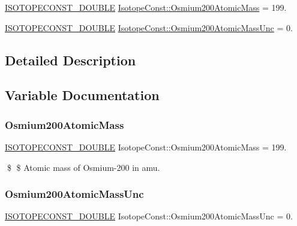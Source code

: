 \begin{DoxyCompactItemize}
\item 
\mbox{\hyperlink{group___isotope_const-_macros_ga8f45a7272ce02c0b4c65c44636ed719a}{I\+S\+O\+T\+O\+P\+E\+C\+O\+N\+S\+T\+\_\+\+D\+O\+U\+B\+LE}} \mbox{\hyperlink{group___isotope_const-_osmium-_os200_ga58991745178f9bca208ead1091e4ff09}{Isotope\+Const\+::\+Osmium200\+Atomic\+Mass}} = 199.
\item 
\mbox{\hyperlink{group___isotope_const-_macros_ga8f45a7272ce02c0b4c65c44636ed719a}{I\+S\+O\+T\+O\+P\+E\+C\+O\+N\+S\+T\+\_\+\+D\+O\+U\+B\+LE}} \mbox{\hyperlink{group___isotope_const-_osmium-_os200_ga963af7ae66cb65d49f5d8d737a31cd21}{Isotope\+Const\+::\+Osmium200\+Atomic\+Mass\+Unc}} = 0.
\end{DoxyCompactItemize}


\subsection{Detailed Description}


\subsection{Variable Documentation}
\mbox{\label{group___isotope_const-_osmium-_os200_ga58991745178f9bca208ead1091e4ff09}} 
\subsubsection{\texorpdfstring{Osmium200\+Atomic\+Mass}{Osmium200AtomicMass}}
{\footnotesize\ttfamily \mbox{\hyperlink{group___isotope_const-_macros_ga8f45a7272ce02c0b4c65c44636ed719a}{I\+S\+O\+T\+O\+P\+E\+C\+O\+N\+S\+T\+\_\+\+D\+O\+U\+B\+LE}} Isotope\+Const\+::\+Osmium200\+Atomic\+Mass = 199.}

\$ \$ Atomic mass of Osmium-\/200 in amu. \mbox{\label{group___isotope_const-_osmium-_os200_ga963af7ae66cb65d49f5d8d737a31cd21}} 
\subsubsection{\texorpdfstring{Osmium200\+Atomic\+Mass\+Unc}{Osmium200AtomicMassUnc}}
{\footnotesize\ttfamily \mbox{\hyperlink{group___isotope_const-_macros_ga8f45a7272ce02c0b4c65c44636ed719a}{I\+S\+O\+T\+O\+P\+E\+C\+O\+N\+S\+T\+\_\+\+D\+O\+U\+B\+LE}} Isotope\+Const\+::\+Osmium200\+Atomic\+Mass\+Unc = 0.}

